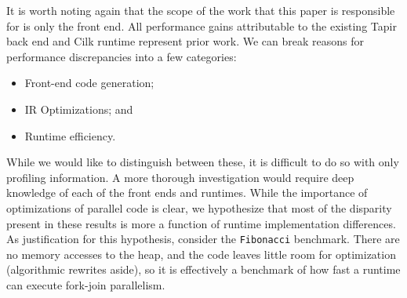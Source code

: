 \documentclass[sigconf]{acmart}
\newcommand{\wmnote}[1]{{\scriptsize \color{red} [[ Billy: #1]]}}
\begin{document}
It is worth noting again that the scope of the work that this paper is
responsible for is only the front end. All performance gains attributable to
the existing Tapir back end and Cilk runtime represent prior work.  We can
break reasons for performance discrepancies into a few categories:
\begin{itemize}
\item Front-end code generation;
\item IR Optimizations; and
\item Runtime efficiency.
\end{itemize}
While we would like to distinguish between these, it is difficult to do so with
only profiling information. A more thorough investigation would require deep
knowledge of each of the front ends and runtimes. While the importance of
optimizations of parallel code is clear, we hypothesize that most of the
disparity present in these results is more a function of runtime implementation
differences. As justification for this hypothesis, consider the
\texttt{Fibonacci} benchmark. There are no memory accesses to the heap, and the
code leaves little room for optimization (algorithmic rewrites aside), so it is
effectively a benchmark of how fast a runtime can execute fork-join
parallelism.

\end{document}
